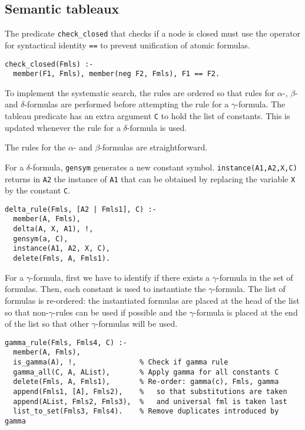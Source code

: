\documentclass[11pt]{article}
\newcommand*{\p}[1]{\textup{\texttt{#1}}}
\begin{document}
\subsection{Semantic tableaux}\label{s.tabfol}

The predicate \p{check\_closed} that checks if a node is closed must use
the operator for syntactical identity \p{==} to prevent unification of
atomic formulas.

\begin{verbatim}
check_closed(Fmls) :-
  member(F1, Fmls), member(neg F2, Fmls), F1 == F2.
\end{verbatim}

To implement the systematic search, the rules are ordered so that rules
for $\alpha$-, $\beta$- and $\delta$-formulas are performed before
attempting the rule for a $\gamma$-formula. The tableau predicate has an
extra argument \p{C} to hold the list of constants. This is updated
whenever the rule for a $\delta$-formula is used.

The rules for the $\alpha$- and $\beta$-formulas are straightforward.

For a $\delta$-formula, \p{gensym} generates a new constant symbol.
\p{instance(A1,A2,X,C)} returns in \p{A2} the instance of \p{A1} that
can be obtained by replacing the variable \p{X} by the constant \p{C}.

\begin{verbatim}
delta_rule(Fmls, [A2 | Fmls1], C) :-
  member(A, Fmls),
  delta(A, X, A1), !,
  gensym(a, C),
  instance(A1, A2, X, C),
  delete(Fmls, A, Fmls1).
\end{verbatim}

For a $\gamma$-formula, first we have to identify if there exists a
$\gamma$-formula in the set of formulas. Then, each constant is used to
instantiate the $\gamma$-formula. The list of formulas is re-ordered:
the instantiated formulas are placed at the head of the list so that
non-$\gamma$-rules can be used if possible and the $\gamma$-formula is
placed at the end of the list so that other $\gamma$-formulas will be
used.

\begin{verbatim}
gamma_rule(Fmls, Fmls4, C) :-
  member(A, Fmls),
  is_gamma(A), !,               % Check if gamma rule
  gamma_all(C, A, AList),       % Apply gamma for all constants C
  delete(Fmls, A, Fmls1),       % Re-order: gamma(c), Fmls, gamma
  append(Fmls1, [A], Fmls2),    %   so that substitutions are taken
  append(AList, Fmls2, Fmls3),  %   and universal fml is taken last
  list_to_set(Fmls3, Fmls4).    % Remove duplicates introduced by gamma
\end{verbatim}
\end{document}
